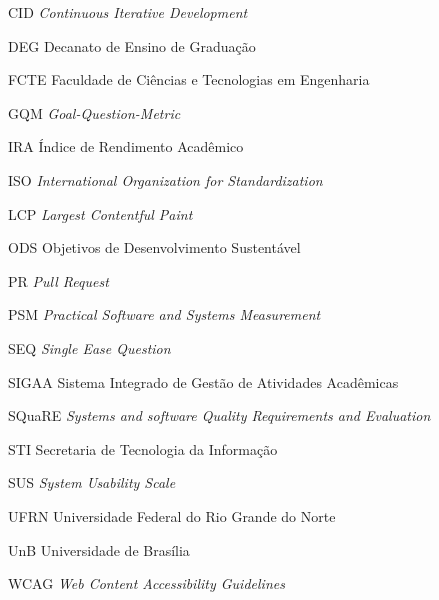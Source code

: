 \begin{siglas}
  \item[CID] \textit{Continuous Iterative Development}
  \item[DEG] Decanato de Ensino de Graduação
  \item[FCTE] Faculdade de Ciências e Tecnologias em Engenharia
  \item[GQM] \textit{Goal-Question-Metric}
  \item[IRA] Índice de Rendimento Acadêmico
  \item[ISO] \textit{International Organization for Standardization}
  \item[LCP] \textit{Largest Contentful Paint}
  \item[ODS] Objetivos de Desenvolvimento Sustentável
  \item[PR] \textit{Pull Request}
  \item[PSM] \textit{Practical Software and Systems Measurement}
  \item[SEQ] \textit{Single Ease Question}
  \item[SIGAA] Sistema Integrado de Gestão de Atividades Acadêmicas
  \item[SQuaRE] \textit{Systems and software Quality Requirements and Evaluation}
  \item[STI] Secretaria de Tecnologia da Informação
  \item[SUS] \textit{System Usability Scale}
  \item[UFRN] Universidade Federal do Rio Grande do Norte
  \item[UnB] Universidade de Brasília
  \item[WCAG] \textit{Web Content Accessibility Guidelines}
\end{siglas}
